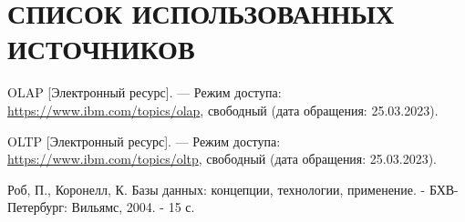 \section*{СПИСОК ИСПОЛЬЗОВАННЫХ ИСТОЧНИКОВ}
\begingroup
\renewcommand{\section}[2]{}
\begin{thebibliography}{}
	
	OLAP [Электронный ресурс]. --- Режим доступа: \url{https://www.ibm.com/topics/olap}, свободный (дата обращения: 25.03.2023).

	OLTP [Электронный ресурс]. --- Режим доступа: \url{https://www.ibm.com/topics/oltp}, свободный (дата обращения: 25.03.2023).
    
    Роб, П., Коронелл, К. Базы данных: концепции, технологии, применение. - БХВ-Петербург: Вильямс, 2004. - 15 с.

\end{thebibliography}
\endgroup

\pagebreak